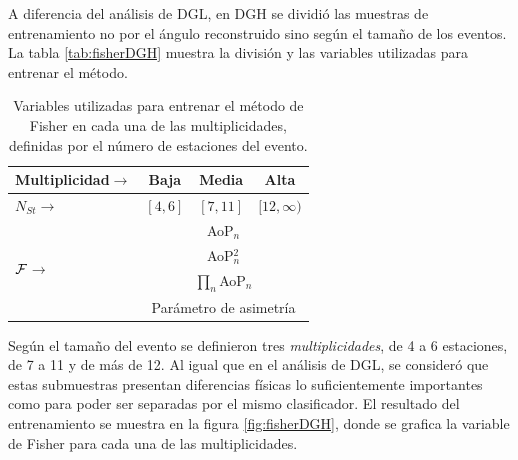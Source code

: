 	A diferencia del análisis de DGL, en DGH se dividió las muestras de entrenamiento no por el ángulo reconstruido sino según el tamaño de los eventos.
	La tabla \ref{tab:fisherDGH} muestra la división y las variables utilizadas para entrenar el método.
	\begin{table}[h!]
		\begin{center}
		\renewcommand{\arraystretch}{1.4}
		\footnotesize
			\begin{tabular}{|l|c|c|c|}
			\hline
			Multiplicidad\hfill$\rightarrow$& Baja & Media & Alta \\
			\hline
			$N_{St}$\hfill$\rightarrow$ & $[4,6]$ & $[7,11]$ & $[12,\infty)$ \\
			\hline
			\multirow{4}{*}{$\cal{F}$\hspace*{25mm}$\rightarrow$}  & \multicolumn{3}{c|}{AoP$_n$} \\
			                 & \multicolumn{3}{c|}{AoP$^2_n$} \\
			                 & \multicolumn{3}{c|}{$\prod_n$AoP$_n$} \\
			                 & \multicolumn{3}{c|}{Parámetro de asimetría} \\
			\hline
			\end{tabular}
			\caption{Variables utilizadas para entrenar el método de Fisher en cada una de las multiplicidades, definidas por el número de estaciones del evento.}
		\end{center}	 
	\end{table}
	Según el tamaño del evento se definieron tres \emph{multiplicidades}, de 4 a 6 estaciones, de 7 a 11 y de más de 12.
	Al igual que en el análisis de DGL, se consideró que estas submuestras presentan diferencias físicas lo suficientemente importantes como para poder ser separadas por el mismo clasificador.
	El resultado del entrenamiento se muestra en la figura \ref{fig:fisherDGH}, donde se grafica la variable de Fisher para cada una de las multiplicidades.
